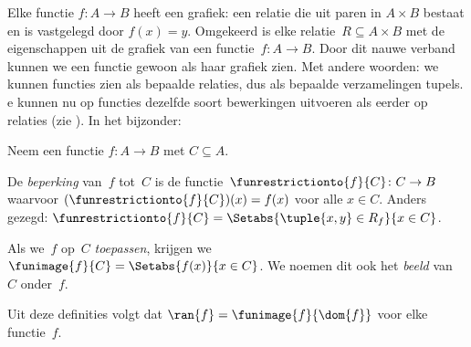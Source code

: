 \documentclass[../../../include/open-logic-section]{subfiles}
\begin{document}
\begin{explain}
Elke functie $f\colon A \to B$ heeft een grafiek: een relatie die uit
paren in $A \times B$ bestaat en is vastgelegd door $f(x) = y$.
Omgekeerd is elke
relatie~$R \subseteq A \times B$ met de eigenschappen uit
 de grafiek van een functie~$f \colon A \to
B$. Door dit nauwe verband kunnen we een functie gewoon als haar
grafiek zien. Met andere woorden: we kunnen functies zien als bepaalde
relaties, dus als bepaalde verzamelingen tupels.
e kunnen nu op functies
dezelfde soort bewerkingen uitvoeren als eerder op relaties (zie
). In het bijzonder:
\end{explain}

\begin{defn}
Neem een functie $f \colon A \to B$ met $C\subseteq A$.

De \emph{beperking} van~$f$ tot~$C$ is de
functie~$\funrestrictionto{f}{C}\colon C \to B$ waarvoor
$(\funrestrictionto{f}{C})(x) = f(x)$ voor alle $x \in C$. Anders
gezegd: $\funrestrictionto{f}{C} = \Setabs{\tuple{x, y} \in R_f}{x
\in C}$.

Als we~$f$ op~$C$ \emph{toepassen}, krijgen we $\funimage{f}{C} =
\Setabs{f(x)}{x \in C}$. We noemen dit ook het \emph{beeld} van~$C$
onder~$f$.
\end{defn}

\begin{explain}
Uit deze definities volgt dat $\ran{f} =
\funimage{f}{\dom{f}}$ voor elke functie~$f$.
\end{explain}
\end{document}
